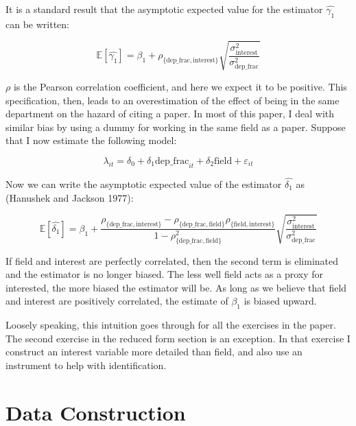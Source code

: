 It is a standard result that the asymptotic expected value for the
estimator $\hat{\gamma_1}$ can be written:

\begin{equation}
    \mathbb{E}[\hat{\gamma_1}] = \beta_1 + \rho_{\{\mbox{dep\_frac},\mbox{interest}\}} \sqrt{\frac{\sigma_{\mbox{interest}}^2}{\sigma_{\mbox{dep\_frac}}^2}}
\end{equation}

$\rho$ is the Pearson correlation coefficient, and here we expect it to
be positive. This specification, then, leads to an overestimation of the
effect of being in the same department on the hazard of citing a paper.
In most of this paper, I deal with similar bias by using a dummy for
working in the same field as a paper. Suppose that I now estimate the
following model:

\begin{equation}
    \lambda_{it} = \delta_0 + \delta_1 \mbox{dep\_frac}_{it} + \delta_2 \mbox{field} + \varepsilon_{it}
\end{equation}

Now we can write the asymptotic expected value of the estimator
$\hat{\delta_1}$ as (Hanushek and Jackson 1977):

\begin{equation}
    \mathbb{E}[\hat{\delta_1}] = \beta_1 + \frac{\rho_{\{\mbox{dep\_frac},\mbox{interest}\}} - \rho_{\{\mbox{dep\_frac},\mbox{field}\}}\rho_{\{\mbox{field},\mbox{interest}\}}}{1 - \rho_{\{\mbox{dep\_frac},\mbox{field}\}}^2} \sqrt{\frac{\sigma_{\mbox{interest}}^2}{\sigma_{\mbox{dep\_frac}}^2}}
\end{equation}

If field and interest are perfectly correlated, then the second term is
eliminated and the estimator is no longer biased. The less well field
acts as a proxy for interested, the more biased the estimator will be.
As long as we believe that field and interest are positively correlated,
the estimate of $\beta_1$ is biased upward.

Loosely speaking, this intuition goes through for all the exercises in
the paper. The second exercise in the reduced form section is an
exception. In that exercise I construct an interest variable more
detailed than field, and also use an instrument to help with
identification.

\clearpage
\section{Data Construction}
\label{sec:dat_cons}

